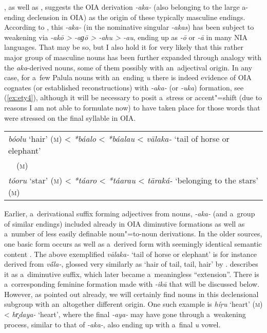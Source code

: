 \citet[15]{morgenstierne1941}, as well as \citet[29]{buddruss1967}, suggests the OIA derivation \textit{-aka-} (also belonging to the large a-ending declension in OIA) as the origin of these typically masculine endings. According to \citet[222]{masica1991}, this \textit{-aka-} (in the nominative singular \textit{-akas}) has been subject to weakening via \textit{-akō {\textgreater} -aɡō {\textgreater} -ahu {\textgreater} -au}, ending up as \textit{-ō} or \textit{-\={a}} in many NIA languages. That may be so, but I also hold it for very likely that this rather major group of masculine nouns has been further expanded through analogy with the \textit{aka}-derived nouns, some of them possibly with an~adjectival origin. In any case, for a~few Palula nouns with an~ending \textit{u} there is indeed evidence of OIA cognates (or established reconstructions) with \textit{-aka-} (or \textit{-uka}) formation, see (\ref{ex:ety4}), although it will be necessary to posit a~stress or accent"=shift (due to reasons I am not able to formulate now) to have taken place for those words that were stressed on the final syllable in OIA. 


\begin{exe}
\extab
\label{ex:4-ety4}
\begin{tabular}{ l }
\textit{bóolu} `hair' (\textsc{m}) {\textless} \textit{*báalo} {\textless} \textit{*báalau} {\textless} \textit{vālaka-} `tail of horse or elephant'\\
~~(\textsc{m})\\
\textit{tóoru} `star' (\textsc{m}) {\textless} \textit{*táaro} {\textless} \textit{*táarau} {\textless} \textit{tāraká-} `belonging to the stars' (\textsc{m})
\end{tabular}
\end{exe}


Earlier, a~derivational suffix forming adjectives from nouns, \textit{-aka-} (and a~group of similar endings) included already in OIA diminutive formations as well as a~number of less easily definable noun"=to-noun derivations. In the older sources, one basic form occurs as well as a~derived form with seemingly identical semantic content \citep[1222]{whitney1960}. The above exemplified \textit{vālaka-} `tail of horse or elephant' is for instance derived from \textit{v\'{\={a}}la-}, glossed very similarly as `hair of tail, tail, hair' by \citet[12056]{turner1966}. \citet[222]{masica1991} describes it as a~diminutive suffix, which later became a~meaningless ``extension''. There is a~corresponding \citep[1181, 1222]{whitney1960} feminine formation made with \textit{-ikā} that will be discussed below. However, as pointed out already, we will certainly find nouns in this declensional subgroup with an~altogether different origin. One such example is \textit{híṛu} `heart' (\textsc{m}) {\textless} \textit{hr̥daya-} `heart', where the final \textit{-aya-} may have gone through a~weakening process, similar to that of \textit{-aka-}, also ending up with a~final \textit{u} vowel.



